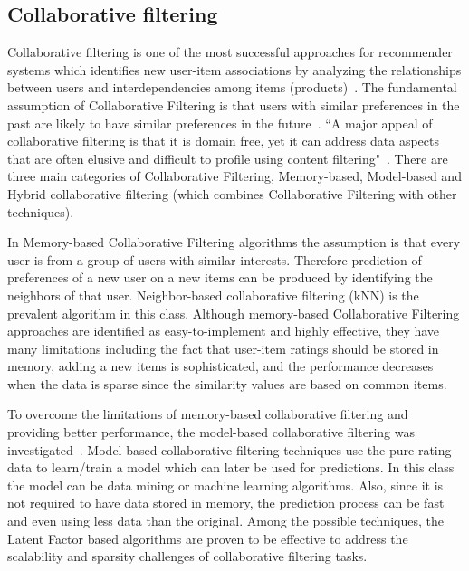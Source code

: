 \subsection{Collaborative filtering}
Collaborative filtering is one of the most successful approaches for recommender systems which identifies new user-item associations by analyzing the relationships between users and interdependencies among items (products)~\cite{koren2009matrix}. The fundamental assumption of Collaborative Filtering is that users with similar preferences in the past are likely to have similar preferences in the future~\cite{su2009survey}. ``A major appeal of collaborative filtering is that it is domain free, yet it can address data aspects that are often elusive and difficult to profile using content filtering"~\cite{koren2009matrix}. There are three main categories of Collaborative Filtering, Memory-based, Model-based and Hybrid collaborative filtering (which combines Collaborative Filtering with other techniques). 

In Memory-based Collaborative Filtering algorithms the assumption is that every user is from a group of users with similar interests. Therefore prediction of preferences of a new user on a new items can be produced by identifying the neighbors of that user.
Neighbor-based collaborative filtering (kNN) is the prevalent algorithm in this class. 
Although memory-based Collaborative Filtering approaches are identified as easy-to-implement and highly eﬀective, they have many limitations including the fact that user-item ratings should be stored in memory, adding a new items is sophisticated, and the performance decreases when the data is sparse since the similarity values are based on common items.


To overcome the limitations of memory-based collaborative filtering and providing better performance, the model-based collaborative filtering was investigated~\cite{su2009survey,la2021evaluating}. Model-based collaborative filtering techniques use the pure rating data to learn/train a model which can later be used for predictions. In this class the model can be data mining or machine learning algorithms. Also, since it is not required to have data stored in memory, the prediction process can be fast and even using less data than the original. Among the possible techniques, the Latent Factor based algorithms are proven to be eﬀective to address the scalability and sparsity challenges of collaborative filtering tasks.



